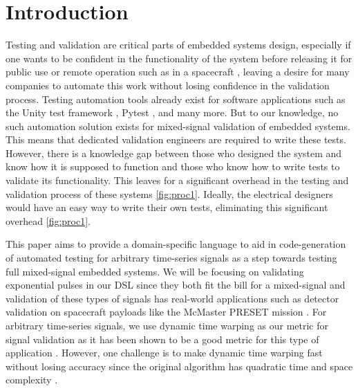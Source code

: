 \documentclass[sigconf,authordraft]{acmart}
\begin{document}
\maketitle

\section{Introduction}

Testing and validation are critical parts of embedded systems design, especially if one wants to be confident in the functionality of the system before releasing it for public use or remote operation such as in a spacecraft \cite{DSL:CyberPhysical}, leaving a desire for many companies to automate this work without losing confidence in the validation process. Testing automation tools already exist for software applications such as the Unity test framework \cite{SW:Unity}, Pytest \cite{SW:Pytest}, and many more. But to our knowledge, no such automation solution exists for mixed-signal validation of embedded systems. This means that dedicated validation engineers are required to write these tests. However, there is a knowledge gap between those who designed the system and know how it is supposed to function and those who know how to write tests to validate its functionality. This leaves for a significant overhead in the testing and validation process of these systems \ref{fig:proc1}. Ideally, the electrical designers would have an easy way to write their own tests, eliminating this significant overhead \ref{fig:proc1}.

This paper aims to provide a domain-specific language to aid in code-generation of automated testing for arbitrary time-series signals as a step towards testing full mixed-signal embedded systems. We will be focusing on validating exponential pulses in our DSL since they both fit the bill for a mixed-signal and validation of these types of signals has real-world applications such as detector validation on spacecraft payloads like the McMaster PRESET mission \cite{PRESET}. For arbitrary time-series signals, we use dynamic time warping as our metric for signal validation as it has been shown to be a good metric for this type of application \cite{SIG:TimeSeriesCompare}. However, one challenge is to make dynamic time warping fast without losing accuracy since the original algorithm has quadratic time and space complexity \cite{SIG:AccelerateDTW}.
\end{document}
